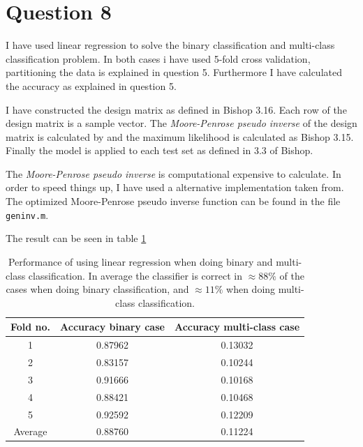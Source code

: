 \documentclass[10pt]{article}
\begin{document}

\section*{Question 8} %
\label{sec:question_8}

I have used linear regression to solve the binary classification and multi-class classification problem. In both cases i have used 5-fold cross validation, partitioning the data is explained in question 5. Furthermore I have calculated the accuracy as explained in question 5.

I have constructed the design matrix as defined in Bishop 3.16\cite{Bishop:2006:PRM:1162264}. Each row of the design matrix is a sample vector. The \emph{Moore-Penrose pseudo inverse} of the design matrix is calculated by and the maximum likelihood is calculated as Bishop 3.15. Finally the model is applied to each test set as defined in 3.3 of Bishop. 

The \emph{Moore-Penrose pseudo inverse} is computational expensive to calculate. In order to speed things up, I have used a alternative implementation taken from\cite{DBLP:journals/corr/abs-0804-4809}. The optimized Moore-Penrose pseudo inverse function can be found in the file \texttt{geninv.m}.

The result can be seen in table \ref{table1}

\begin{table}
  \begin{center}  
    \begin{tabular}{ | c | c | c |}
      \hline
      Fold no. & Accuracy binary case & Accuracy multi-class case\\
      \hline
      1       &  0.87962  &  0.13032\\
      2       &  0.83157  &  0.10244\\
      3       &  0.91666  &  0.10168\\
      4       &  0.88421  &  0.10468\\
      5       &  0.92592  &  0.12209\\
      \hline
      Average &  0.88760  &  0.11224\\
      \hline      
    \end{tabular}
    \caption{Performance of using linear regression when doing binary and multi-class classification. In average the classifier is correct in $\approx 88\%$ of the cases when doing binary classification, and $\approx 11\%$ when doing multi-class classification.}
    \label{table1}
  \end{center}    
\end{table}   
                                       
\end{document}
